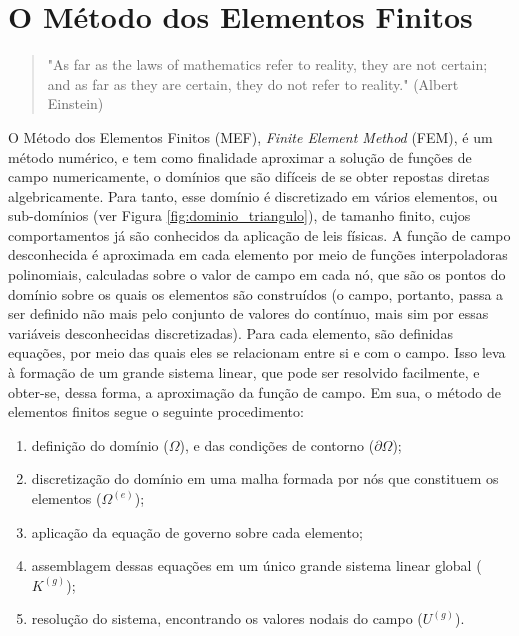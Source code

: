 \chapter{O Método dos Elementos Finitos}

\begin{quote}
    "As far as the laws of mathematics refer to reality, they are not certain; and as far as they are certain, they do not refer to reality." (Albert Einstein)
\end{quote}

O Método dos Elementos Finitos (MEF), \emph{Finite Element Method} (FEM), é um método numérico, e tem como finalidade aproximar a solução de funções de campo numericamente, o domínios que são difíceis de se obter repostas diretas algebricamente. Para tanto, esse domínio é discretizado em vários elementos, ou sub-domínios (ver Figura \ref{fig:dominio_triangulo}), de tamanho finito, cujos comportamentos já são conhecidos da aplicação de leis físicas. A função de campo desconhecida é aproximada em cada elemento por meio de funções interpoladoras polinomiais, calculadas sobre o valor de campo em cada nó, que são os pontos do domínio sobre os quais os elementos são construídos (o campo, portanto, passa a ser definido não mais pelo conjunto de valores do contínuo, mais sim por essas variáveis desconhecidas discretizadas). Para cada elemento, são definidas equações, por meio das quais eles se relacionam entre si e com o campo. Isso leva à formação de um grande sistema linear, que pode ser resolvido facilmente, e obter-se, dessa forma, a aproximação da função de campo. \cite{Onate} Em sua, o método de elementos finitos segue o seguinte procedimento:

\begin{enumerate}
    \item definição do domínio ($\Omega$), e das condições de contorno ($\partial\Omega$);
    \item discretização do domínio em uma malha formada por nós que constituem os elementos ($\Omega^{(e)}$);
    \item aplicação da equação de governo sobre cada elemento;
    \item assemblagem dessas equações em um único grande sistema linear global ($K^{(g)}$);
    \item resolução do sistema, encontrando os valores nodais do campo ($U^{(g)}$).
\end{enumerate}



